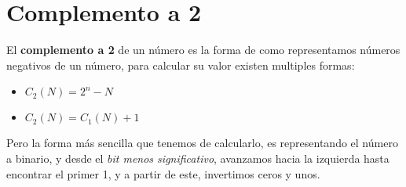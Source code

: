 \section{Complemento a 2}

El \textbf{complemento a 2} de un número es la forma de como representamos
números negativos de un número, para calcular su valor existen multiples formas:

\begin{itemize}
    \item $C_2(N) = 2^n - N$
    \item $C_2(N) = C_1(N) + 1$
\end{itemize}

Pero la forma más sencilla que tenemos de calcularlo, es representando el número
a binario, y desde el \emph{bit menos significativo}, avanzamos hacia la izquierda
hasta encontrar el primer 1, y a partir de este, invertimos ceros y unos.